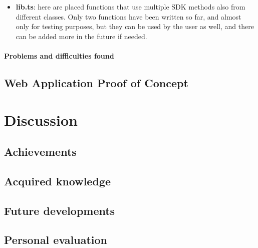 \begin{itemize}
    \item \textbf{lib.ts}: here are placed functions that use multiple SDK methods also from
    different classes. Only two functions have been written so far, and almost only for
    testing purposes, but they can be used by the user as well, and there can be added more 
    in the future if needed.
    
\end{itemize}

\paragraph{Problems and difficulties found}

\subsection{Web Application Proof of Concept}

\section{Discussion}
\subsection{Achievements}
\subsection{Acquired knowledge}
\subsection{Future developments}
\subsection{Personal evaluation}
